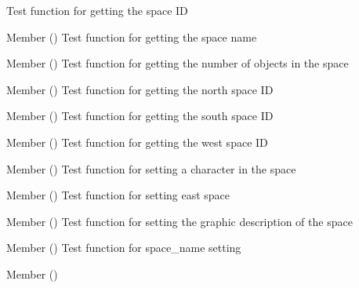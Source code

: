 \begin{DoxyRefList}
%
Test function for getting the space ID  
\item[Member \doxylink{space__test_8h_aee88ed31c63efc674051a4563aed86e2}{test2\+\_\+space\+\_\+get\+\_\+name} ()]\label{test__test000140}%
%
Test function for getting the space name  
\item[Member \doxylink{space__test_8h_a7917b92deab1019eafce59479a577c2c}{test2\+\_\+space\+\_\+get\+\_\+nobjects} ()]\label{test__test000150}%
%
Test function for getting the number of objects in the space  
\item[Member \doxylink{space__test_8h_a61891c9cebb9d26dc9f149ad8341517c}{test2\+\_\+space\+\_\+get\+\_\+north} ()]\label{test__test000142}%
%
Test function for getting the north space ID  
\item[Member \doxylink{space__test_8h_a40fe07c07c1069023b362a9e506c4c59}{test2\+\_\+space\+\_\+get\+\_\+south} ()]\label{test__test000144}%
%
Test function for getting the south space ID  
\item[Member \doxylink{space__test_8h_af1cf02b01c007aec0684186b39666c32}{test2\+\_\+space\+\_\+get\+\_\+west} ()]\label{test__test000148}%
%
Test function for getting the west space ID  
\item[Member \doxylink{space__test_8h_a8e7d3726a7551c0de5825cc882836a71}{test2\+\_\+space\+\_\+set\+\_\+character} ()]\label{test__test000134}%
%
Test function for setting a character in the space  
\item[Member \doxylink{space__test_8h_a5df66d103388be4518c379b224f53770}{test2\+\_\+space\+\_\+set\+\_\+east} ()]\label{test__test000128}%
%
Test function for setting east space  
\item[Member \doxylink{space__test_8h_af40c7a664b529a39c3d98dca3d0af708}{test2\+\_\+space\+\_\+set\+\_\+gdesc} ()]\label{test__test000136}%
%
Test function for setting the graphic description of the space  
\item[Member \doxylink{space__test_8h_a5a868ba017602ba6b58447cb394e81a6}{test2\+\_\+space\+\_\+set\+\_\+name} ()]\label{test__test000121}%
%
Test function for space\+\_\+name setting  
\item[Member \doxylink{space__test_8h_a89e10cfa4b1854ac26f36ea0c1ac1ef4}{test2\+\_\+space\+\_\+set\+\_\+new\+\_\+object} ()]\label{test__test000132}%

\end{DoxyRefList}
